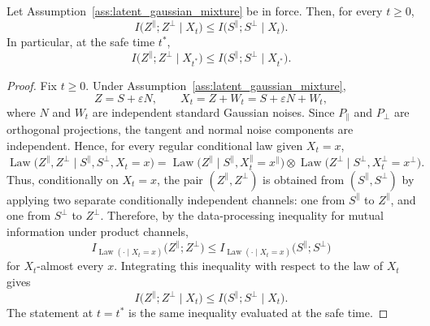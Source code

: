 \documentclass[twoside,11pt]{article}
\newcommand{\Law}{\operatorname{Law}}
\numberwithin{equation}{section}
\begin{document}
\begin{proposition}
\label{prop:latent_cmi_dpi}
Let Assumption~\ref{ass:latent_gaussian_mixture} be in force. Then, for every \(t\ge 0\),
\[
I\!\big(Z^\parallel;Z^\perp\mid X_t\big)
\le
I\!\big(S^\parallel;S^\perp\mid X_t\big).
\]
In particular, at the safe time \(t^*\),
\[
I\!\big(Z^\parallel;Z^\perp\mid X_{t^*}\big)
\le
I\!\big(S^\parallel;S^\perp\mid X_{t^*}\big).
\]
\end{proposition}

\begin{proof}
Fix \(t\ge0\). Under Assumption~\ref{ass:latent_gaussian_mixture},
\[
Z=S+\varepsilon N,
\qquad
X_t=Z+W_t=S+\varepsilon N+W_t,
\]
where \(N\) and \(W_t\) are independent standard Gaussian noises. Since
\(P_\parallel\) and \(P_\perp\) are orthogonal projections, the tangent and normal
noise components are independent. Hence, for every regular conditional law given
\(X_t=x\),
\[
\Law\!\big(Z^\parallel,Z^\perp \mid S^\parallel,S^\perp,X_t=x\big)
=
\Law\!\big(Z^\parallel \mid S^\parallel,X_t^\parallel=x^\parallel\big)
\otimes
\Law\!\big(Z^\perp \mid S^\perp,X_t^\perp=x^\perp\big).
\]
Thus, conditionally on \(X_t=x\), the pair
\((Z^\parallel,Z^\perp)\) is obtained from
\((S^\parallel,S^\perp)\) by applying two separate conditionally independent
channels: one from \(S^\parallel\) to \(Z^\parallel\), and one from
\(S^\perp\) to \(Z^\perp\). Therefore, by the data-processing inequality for
mutual information under product channels,
\[
I_{\Law(\cdot\mid X_t=x)}\!\big(Z^\parallel;Z^\perp\big)
\le
I_{\Law(\cdot\mid X_t=x)}\!\big(S^\parallel;S^\perp\big)
\]
for \(X_t\)-almost every \(x\). Integrating this inequality with respect to the
law of \(X_t\) gives
\[
I\!\big(Z^\parallel;Z^\perp\mid X_t\big)
\le
I\!\big(S^\parallel;S^\perp\mid X_t\big).
\]
The statement at \(t=t^*\) is the same inequality evaluated at the safe time.
\end{proof}
\end{document}
